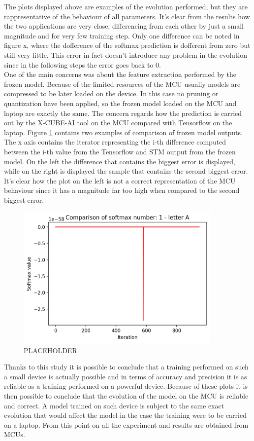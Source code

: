 \documentclass[12pt]{report}
\begin{document}
%
The plots displayed above are examples of the evolution performed, but they are rappresentative of the behaviour of all parameters. It's clear from the results how the two applications are very close, differencing from each other by just a small magnitude and for very few training step. Only one difference can be noted in figure x, where the dofference of the softmax prediction is dofferent from zero but still very little. This error in fact doesn't introduce any problem in the evolution since in the following steps the error goes back to 0. \\
One of the main concerns was about the feature extraction performed by the frozen model. Because of the limited resources of the MCU usually models are compressed to be later loaded on the device. In this case no pruning or quantization have been applied, so the frozen model loaded on the MCU and laptop are exactly the same. The concern regards how the prediction is carried out by the X-CUBE-AI tool on the MCU compared with Tensorflow on the laptop. Figure \ref{fig:comparison_max} contains two examples of comparison of frozen model outputs. The x axis contains the iterator representing the i-th difference computed between the i-th value from the Tensorflow and STM output from the frozen model. On the left the difference that contains the biggest error is displayed, while on the right is displayed the sample that contains the second biggest error. It's clear how the plot on the left is not a correct representation of the MCU behaviour since it has a magnitude far too high when compared to the second biggest error.
%
\begin{figure}[h!]
    \centering
    \includegraphics[width=100mm]{Figures/Chapter5/comparison_difference.png} 
    \caption{PLACEHOLDER}
    \label{fig:comparison_max}    
\end{figure}
%
Thanks to this study it is possible to conclude that a training performed on such a small device is actually possible and in terms of accuracy and precision it is as reliable as a training performed on a powerful device. Because of these plots it is then possible to conclude that the evolution of the model on the MCU is reliable and correct. A model trained on such device is subject to the same exact evolution that would affect the model in the case the training were to be carried on a laptop. From this point on all the experiment and results are obtained from MCUs.
\bigskip
\end{document}
